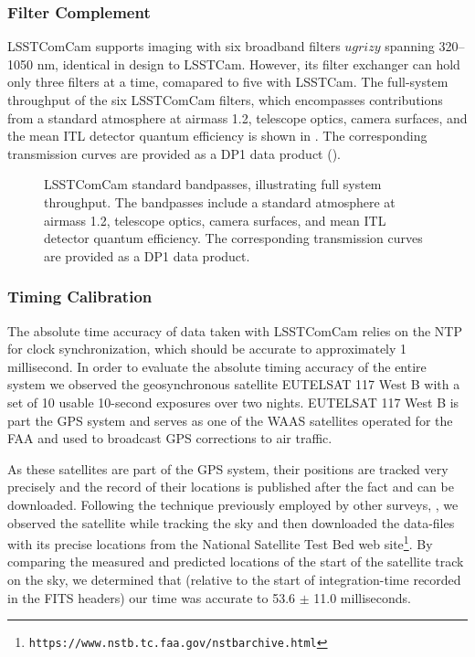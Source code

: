 \subsubsection{Filter Complement}
\label{sssec:comcam_filters}
\gls{LSSTComCam} supports imaging with six broadband filters $ugrizy$ spanning 320--1050 nm, identical in design to \gls{LSSTCam}.
However, its filter exchanger can hold only three filters at a time, comapared to five with \gls{LSSTCam}.
The full-system throughput of the six \gls{LSSTComCam} filters, which encompasses contributions from a standard atmosphere at airmass 1.2, telescope optics, camera surfaces, and the mean \gls{ITL} detector quantum efficiency is shown in .
The corresponding transmission curves are provided as a \gls{DP1} data product ().
\begin{figure}[htb!]
\caption{\gls{LSSTComCam} standard bandpasses, illustrating full system throughput. The bandpasses include a standard atmosphere at airmass 1.2, telescope optics, camera surfaces, and mean \gls{ITL} detector quantum efficiency. The corresponding transmission curves are provided as a \gls{DP1} data product.}
\label{fig:comcam_standard_bandpasses}
\end{figure}

\subsubsection{Timing Calibration}
\label{ssec:comcam_timing}
The absolute time accuracy of data taken with \gls{LSSTComCam} relies on the \gls{NTP} for clock synchronization, which should be accurate to approximately 1 millisecond. 
In order to evaluate the absolute timing accuracy of the entire system we observed the geosynchronous satellite EUTELSAT 117 West B with a set of 10 usable 10-second exposures over two nights.  
EUTELSAT 117 West B is part the \gls{GPS} system and serves as one of the \gls{WAAS} satellites operated for the \gls{FAA} and used to broadcast \gls{GPS} corrections to air traffic.

As these satellites are part of the \gls{GPS} system, their positions are tracked very precisely and the record of their locations is published after the fact and can be downloaded.  
Following the technique previously employed by other surveys, \citep{2018PASP..130f4505T},  we observed the satellite while tracking the sky and then downloaded the data-files with its precise locations from the National Satellite Test Bed web site\footnote{\nolinkurl{https://www.nstb.tc.faa.gov/nstbarchive.html}}.  
By comparing the measured and predicted locations of the start of the satellite track on the sky, we determined that (relative to the start of integration-time recorded in the \gls{FITS} headers) our time was accurate to 53.6 $\pm$ 11.0 milliseconds.

